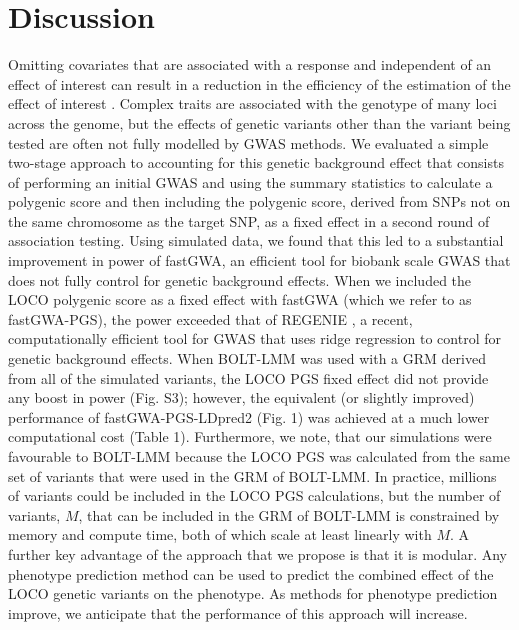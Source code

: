 \documentclass[fleqn,10pt]{wlscirep}
\begin{document}
\par

\section*{Discussion}
Omitting covariates that are associated with a response and independent of an effect of interest can result in a reduction in the efficiency of the estimation of the effect of interest \cite{fisher1935, neuhaus1998estimation}. Complex traits are associated with the genotype of many loci across the genome, but the effects of genetic variants other than the variant being tested are often not fully modelled by GWAS methods. We evaluated a simple two-stage approach to accounting for this genetic background effect that consists of performing an initial GWAS and using the summary statistics to calculate a polygenic score and then including the polygenic score, derived from SNPs not on the same chromosome as the target SNP, as a fixed effect in a second round of association testing. Using simulated data, we found that this led to a substantial improvement in power of fastGWA, an efficient tool for biobank scale GWAS that does not fully control for genetic background effects. When we included the LOCO polygenic score as a fixed effect with fastGWA (which we refer to as fastGWA-PGS), the power exceeded that of REGENIE \cite{mbatchou2020computationally}, a recent, computationally efficient tool for GWAS that uses ridge regression to control for genetic background effects. When BOLT-LMM  \cite{BOLT} was used with a GRM derived from all of the simulated variants, the LOCO PGS fixed effect did not provide any boost in power (Fig. S3); however, the equivalent (or slightly improved) performance of fastGWA-PGS-LDpred2 (Fig. 1) was achieved at a much lower computational cost (Table 1). Furthermore, we note, that our simulations were favourable to BOLT-LMM because the LOCO PGS was calculated from the same set of variants that were used in the GRM of BOLT-LMM. In practice, millions of variants could be included in the LOCO PGS calculations, but the number of variants, $M$, that can be included in the GRM of BOLT-LMM is constrained by memory and compute time, both of which scale at least linearly with $M$. A further key advantage of the approach that we propose is that it is modular. Any phenotype prediction method can be used to predict the combined effect of the LOCO genetic variants on the phenotype. As methods for phenotype prediction improve, we anticipate that the performance of this approach will increase.
\end{document}
